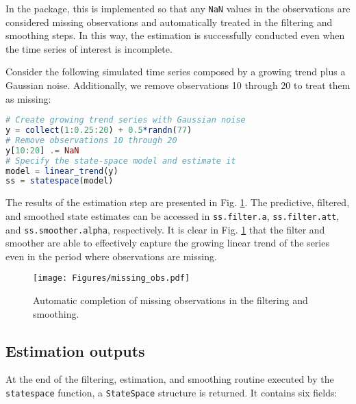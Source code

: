 \documentclass{juliacon}
\begin{document}
In the package, this is implemented so that any \texttt{NaN} values in the observations are considered missing observations and automatically treated in the filtering and smoothing steps. In this way, the estimation is successfully conducted even when the time series of interest is incomplete.

Consider the following simulated time series composed by a growing trend plus a Gaussian noise. Additionally, we remove observations 10 through 20 to treat them as missing:
%
\begin{lstlisting}[language = Julia]
# Create growing trend series with Gaussian noise
y = collect(1:0.25:20) + 0.5*randn(77)
# Remove observations 10 through 20
y[10:20] .= NaN
# Specify the state-space model and estimate it
model = linear_trend(y)
ss = statespace(model)
\end{lstlisting}
%
The results of the estimation step are presented in Fig. \ref{fig:missing_observations}. The predictive, filtered, and smoothed state estimates can be accessed in \texttt{ss.filter.a}, \texttt{ss.filter.att}, and \texttt{ss.smoother.alpha}, \mbox{respectively}. It is clear in Fig. \ref{fig:missing_observations} that the filter and smoother are able to effectively capture the growing linear trend of the series even in the period where observations are missing.
%
\begin{figure}[h]
	\centering
	\texttt{[image: Figures/missing\_obs.pdf]}
	\caption{Automatic completion of missing observations in the filtering and smoothing.}
	\label{fig:missing_observations}
\end{figure}

\subsection{Estimation outputs}

At the end of the filtering, estimation, and smoothing routine executed by the \texttt{statespace} function, a \texttt{StateSpace} structure is returned. It contains six fields:
\end{document}
